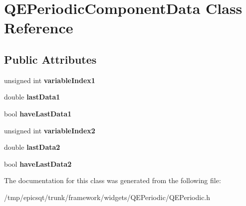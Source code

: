 \hypertarget{classQEPeriodicComponentData}{
\section{QEPeriodicComponentData Class Reference}
\label{classQEPeriodicComponentData}
}
\subsection*{Public Attributes}
\begin{DoxyCompactItemize}
\item 
\hypertarget{classQEPeriodicComponentData_a4753cf0131911f995545309462f8f821}{
unsigned int {\bfseries variableIndex1}}
\label{classQEPeriodicComponentData_a4753cf0131911f995545309462f8f821}

\item 
\hypertarget{classQEPeriodicComponentData_a8d8579fece197fe1a056c767c7fd5cdf}{
double {\bfseries lastData1}}
\label{classQEPeriodicComponentData_a8d8579fece197fe1a056c767c7fd5cdf}

\item 
\hypertarget{classQEPeriodicComponentData_a8798839c4468f8fc517e31f7ed291fcc}{
bool {\bfseries haveLastData1}}
\label{classQEPeriodicComponentData_a8798839c4468f8fc517e31f7ed291fcc}

\item 
\hypertarget{classQEPeriodicComponentData_aab15bcb806ecb3d6c8da1a7c353c3981}{
unsigned int {\bfseries variableIndex2}}
\label{classQEPeriodicComponentData_aab15bcb806ecb3d6c8da1a7c353c3981}

\item 
\hypertarget{classQEPeriodicComponentData_a3483e48486e6038cb710403aa5ca34f5}{
double {\bfseries lastData2}}
\label{classQEPeriodicComponentData_a3483e48486e6038cb710403aa5ca34f5}

\item 
\hypertarget{classQEPeriodicComponentData_a44692a7852318b6f37fc171ad6f03b1b}{
bool {\bfseries haveLastData2}}
\label{classQEPeriodicComponentData_a44692a7852318b6f37fc171ad6f03b1b}

\end{DoxyCompactItemize}


The documentation for this class was generated from the following file:\begin{DoxyCompactItemize}
\item 
/tmp/epicsqt/trunk/framework/widgets/QEPeriodic/QEPeriodic.h\end{DoxyCompactItemize}
